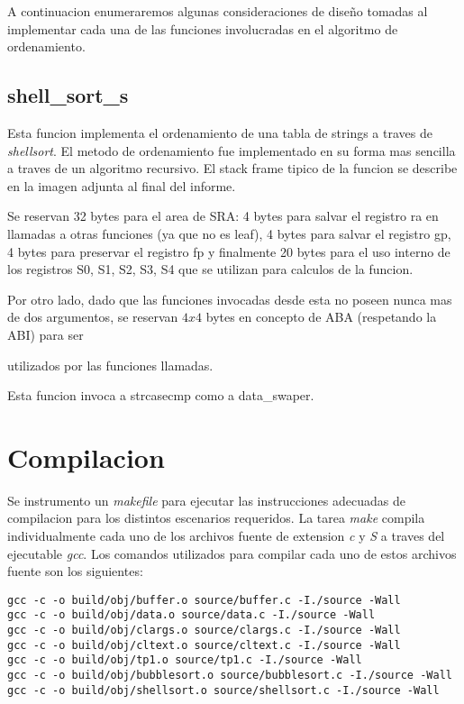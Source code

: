 \documentclass[a4paper,11pt]{article}
\begin{document}
A continuacion enumeraremos algunas consideraciones de diseño tomadas al
implementar cada una de las funciones involucradas en el algoritmo de
ordenamiento.

\subsection{shell\_sort\_s}

Esta funcion implementa el ordenamiento de una tabla de strings a traves de
\textit{shellsort}. El metodo de ordenamiento fue implementado en su forma mas
sencilla a traves de un algoritmo recursivo. El stack frame tipico de la
funcion se describe en la imagen adjunta al final del informe.

\FloatBarrier

Se reservan 32 bytes para el area de SRA: 4 bytes para salvar el registro ra en llamadas a otras funciones (ya que no es leaf), 4 bytes para salvar el registro gp, 4 bytes para preservar el registro fp y finalmente 20 bytes para el uso interno de los registros S0, S1, S2, S3, S4 que se utilizan para calculos de la funcion.

Por otro lado, dado que las funciones invocadas desde esta no poseen nunca mas
de dos argumentos, se reservan \(4 x 4\) bytes en concepto de ABA (respetando la ABI) para ser

utilizados por las funciones llamadas.

Esta funcion invoca a strcasecmp como a data\_swaper.

\FloatBarrier

\section{Compilacion}

Se instrumento un \textit{makefile} para ejecutar las instrucciones adecuadas
de compilacion para los distintos escenarios requeridos. La
tarea \textit{make} compila individualmente cada uno de los archivos fuente de
extension \textit{c} y \textit{S} a traves del ejecutable \textit{gcc}.
Los comandos utilizados para compilar cada uno de estos archivos fuente son los
siguientes:

\begin{lstlisting}
gcc -c -o build/obj/buffer.o source/buffer.c -I./source -Wall 
gcc -c -o build/obj/data.o source/data.c -I./source -Wall 
gcc -c -o build/obj/clargs.o source/clargs.c -I./source -Wall 
gcc -c -o build/obj/cltext.o source/cltext.c -I./source -Wall 
gcc -c -o build/obj/tp1.o source/tp1.c -I./source -Wall 
gcc -c -o build/obj/bubblesort.o source/bubblesort.c -I./source -Wall 
gcc -c -o build/obj/shellsort.o source/shellsort.c -I./source -Wall 
\end{lstlisting}
\end{document}
